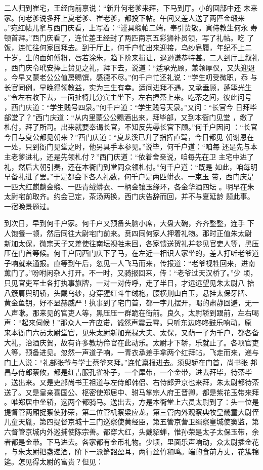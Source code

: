 二人归到崔宅，王经向前禀说：“新升何老爹来拜，下马到厅。小的回部中还
未来家。何老爹说多拜上夏老爹、崔老爹，都投下帖。午间又差人送了两匹金缎来
。”宛红帖儿拿与西门庆看，上写着：“谨具缎帕二端，奉引贽敬。寅侍教生何永
寿顿首拜。”西门庆看了，连忙差王经封了两匹南京五彩狮补员领，写了礼帖。吃
了饭，连忙往何家回拜去。到于厅上，何千户忙出来迎接，乌纱皂履，年纪不上二
十岁，生的面如傅粉，唇若涂朱，趋下阶来揖让，退逊谦恭特甚。二人到厅上叙礼
，西门庆令玳安捧上贽见之礼，拜下去，说道：“适承光顾，兼领厚仪，又失迎迓
。今早又蒙老公公值房赐馔，感德不尽。”何千户忙还礼说：“学生叨受微职，忝
与长官同例，早晚得领教益，实为三生有幸。适间进拜不遇，又承垂顾，蓬筚光生
。”令左右收下去，一面扯椅儿分宾主坐下，左右捧茶上来。吃茶之间，彼此问号
，西门庆道：“学生贱号四泉。”何千户道：“学生贱号天泉。”又问：“长官今
日拜毕部堂了？”西门庆道：“从内里蒙公公赐酒出来，拜毕部，又到本衙门见堂
，缴了札付，拜了所司。出来就要奉谒长官，不知反先辱长官下顾。”何千户因问
：“长官今日与夏公都见朝来？”西门庆道：“夏龙溪已升了指挥直驾，今日都见
朝谢恩在一处，只到衙门见堂之时，他另具手本参见。”说毕，何千户道：“咱每
还是先与本主老爹进礼，还是先领札付？”西门庆道：“依着舍亲说，咱每先在卫
主宅中进了礼，然后大朝引奏，还在本衙门到堂同众领札付。”何千户道：“既是
如此，咱每明早备礼进了罢。”于是都会下各人礼数，何千户是两匹蟒衣、一束玉
带，西门庆是一匹大红麒麟金缎、一匹青绒蟒衣、一柄金镶玉绦环，各金华酒四坛
。明早在朱太尉宅前取齐。约会已定，茶汤两换，西门庆告辞而回，并不与夏延龄
题此事。一宿晚景题过。

到次日，早到何千户家。何千户又预备头脑小席，大盘大碗，齐齐整整，连手
下人饱餐一顿，然后同往大尉宅门前来。贲四同何家人押着礼物。那时正值朱太尉
新加太保，微宗天子又差使往南坛视牲未回，各家馈送贺礼并参见官吏人等，黑压
压在门首等候。何千户同西门庆下了马，在左近一相识人家坐的，差人打听老爷道
子响就来通报。直等到午后，忽见一人飞马而来，传报道：“老爷视牲回来，进南
薰门了。”吩咐闲杂人打开。不一时，又骑报回来，传：“老爷过天汉桥了。”少
顷，只见官吏军士各打执事旗牌，一对一对传呼，走了半日，才远远望见朱太尉八
抬八簇肩舆明轿，头戴乌纱，身穿猩红斗牛绒袍，腰横荆山白玉，悬挂太保牙牌、
黄金鱼钥，好不显赫威严！执事到了宅门首，都一字儿摆开，喝的肃静回避，无一
人声嗽。那来见的官吏人等，黑压压一群跪在街前。良久，太尉轿到跟前，左右喝
声：“起来伺候！”那众人一齐应诺，诚然声震云霄。只听东边咚咚鼓乐响动，原
来本衙门六员太尉堂官，见朱太尉新加光禄大夫、太保，又荫一子为千户，都各备
大礼，治酒庆贺，故有许多教坊伶官在此动乐。太尉才下轿，乐就止了。各项官吏
人等，预备进见。忽然一声道子响，一青衣承差手拿两个红拜帖，飞走而来，递与
门上人说：“礼部张爷与学士蔡爷来拜。”连忙禀报进去。须臾轿在门首，尚书张
邦昌与侍郎蔡攸，都是红吉服孔雀补子，一个犀带，一个金带，进去拜毕，待茶毕
，送出来。又是吏部尚书王祖道与左侍郎韩侣、右侍郎尹京也来拜，朱太尉都待茶
送了。又是皇亲喜国公、枢密使郑居中、驸马掌宗人府王晋卿，都是紫花玉带来拜
。唯郑居中坐轿，这两个都骑马。送出去，方是本衙堂上六员太尉到了：头一位是
提督管两厢捉察使孙荣，第二位管机察梁应龙，第三管内外观察典牧皇畿童大尉侄
儿童天胤，第四提督京城十三门巡察使黄经臣，第五管京营卫缉察皇城使窦监，第
六督管京城内外巡捕使陈宗善。都穿大红，头戴貂蝉，惟孙荣是太子太保玉带，余
者都是金带。下马进去。各家都有金币礼物。少顷，里面乐声响动，众太尉插金花
，与朱太尉把盏递酒，阶下一派箫韶盈耳，两行丝竹和鸣。端的食前方丈，花簇锦
筵。怎见得太尉的富贵？但见：

